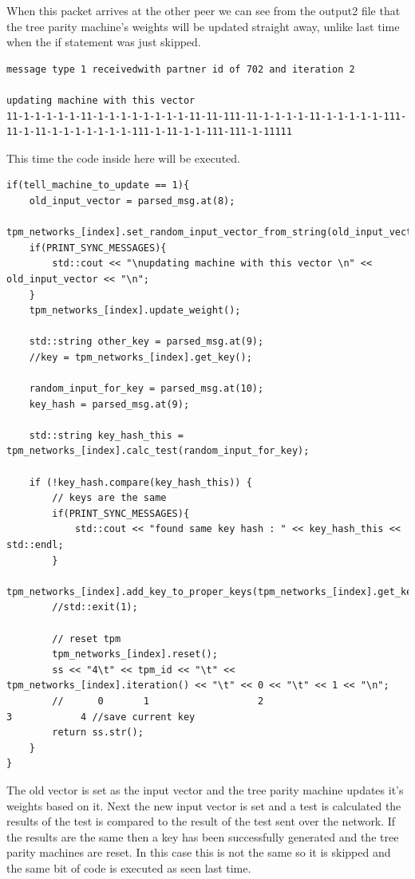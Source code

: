 When this packet arrives at the other peer we can see from the output2 file that the tree parity machine's weights will be updated straight away, unlike last time when the if statement was just skipped.
\begin{lstlisting}
message type 1 receivedwith partner id of 702 and iteration 2

updating machine with this vector 
11-1-1-1-1-1-11-1-1-1-1-1-1-1-1-11-11-111-11-1-1-1-1-11-1-1-1-1-1-111-11-1-11-1-1-1-1-1-1-1-111-1-11-1-1-111-111-1-11111
\end{lstlisting}
This time the code inside here will be executed.
\begin{lstlisting}
if(tell_machine_to_update == 1){
	old_input_vector = parsed_msg.at(8);
	tpm_networks_[index].set_random_input_vector_from_string(old_input_vector);
	if(PRINT_SYNC_MESSAGES){
		std::cout << "\nupdating machine with this vector \n" << old_input_vector << "\n";
	}
	tpm_networks_[index].update_weight();
	
	std::string other_key = parsed_msg.at(9);
	//key = tpm_networks_[index].get_key();
	
	random_input_for_key = parsed_msg.at(10);
	key_hash = parsed_msg.at(9);
	
	std::string key_hash_this = tpm_networks_[index].calc_test(random_input_for_key);

	if (!key_hash.compare(key_hash_this)) {
		// keys are the same
		if(PRINT_SYNC_MESSAGES){
			std::cout << "found same key hash : " << key_hash_this << std::endl;
		}
		tpm_networks_[index].add_key_to_proper_keys(tpm_networks_[index].get_key());
		//std::exit(1);
		
		// reset tpm
		tpm_networks_[index].reset();
		ss << "4\t" << tpm_id << "\t" << tpm_networks_[index].iteration() << "\t" << 0 << "\t" << 1 << "\n";
		//      0       1                   2                                         3            4 //save current key
		return ss.str();
	}
}
\end{lstlisting}
The old vector is set as the input vector and the tree parity machine updates it's weights based on it. Next the new input vector is set and a test is calculated the results of the test is compared to the result of the test sent over the network. If the results are the same then a key has been successfully generated and the tree parity machines are reset. In this case this is not the same so it is skipped and the same bit of code is executed as seen last time. 

